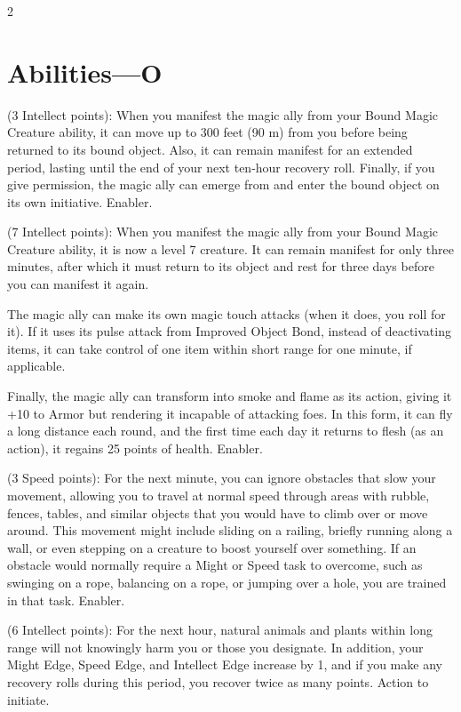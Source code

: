 \begin{multicols}{2}

\section{Abilities—O}

 (3 Intellect points): When you manifest the magic ally from your Bound Magic Creature ability, it can move up to 300 feet (90 m) from you before being returned to its bound object. Also, it can remain manifest for an extended period, lasting until the end of your next ten-hour recovery roll. Finally, if you give permission, the magic ally can emerge from and enter the bound object on its own initiative. Enabler. 
 
 (7 Intellect points): When you manifest the magic ally from your Bound Magic Creature ability, it is now a level 7 creature. It can remain manifest for only three minutes, after which it must return to its object and rest for three days before you can manifest it again. 

The magic ally can make its own magic touch attacks (when it does, you roll for it). If it uses its pulse attack from Improved Object Bond, instead of deactivating items, it can take control of one item within short range for one minute, if applicable. 

Finally, the magic ally can transform into smoke and flame as its action, giving it +10 to Armor but rendering it incapable of attacking foes. In this form, it can fly a long distance each round, and the first time each day it returns to flesh (as an action), it regains 25 points of health. 
Enabler. 
 
 (3 Speed points): For the next minute, you can ignore obstacles that slow your movement, allowing you to travel at normal speed through areas with rubble, fences, tables, and similar objects that you would have to climb over or move around. This movement might include sliding on a railing, briefly running along a wall, or even stepping on a creature to boost yourself over something. If an obstacle would normally require a Might or Speed task to overcome, such as swinging on a rope, balancing on a rope, or jumping over a hole, you are trained in that task. Enabler. 
 
 (6 Intellect points): For the next hour, natural animals and plants within long range will not knowingly harm you or those you designate. In addition, your Might Edge, Speed Edge, and Intellect Edge increase by 1, and if you make any recovery rolls during this period, you recover twice as many points. Action to initiate. 
 

\end{multicols}
